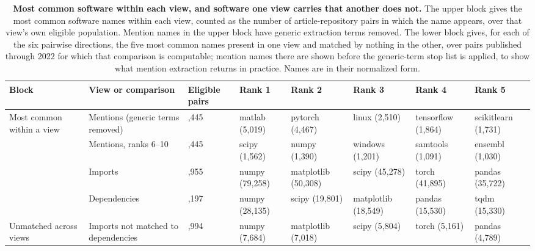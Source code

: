 \documentclass[pdflatex,sn-nature]{sn-jnl}%
\begin{document}


\begin{table}
\caption{\textbf{Most common software within each view, and software one view carries that another does not.} The upper block gives the most common software names within each view, counted as the number of article-repository pairs in which the name appears, over that view's own eligible population. Mention names in the upper block have generic extraction terms removed. The lower block gives, for each of the six pairwise directions, the five most common names present in one view and matched by nothing in the other, over pairs published through 2022 for which that comparison is computable; mention names there are shown before the generic-term stop list is applied, to show what mention extraction returns in practice. Names are in their normalized form.}\label{stab:topsoftware}
\footnotesize
\setlength{\tabcolsep}{2.5pt}
\begin{tabular}{@{}>{\raggedright\arraybackslash}p{44pt}>{\raggedright\arraybackslash}p{86pt}>{\raggedleft\arraybackslash}p{32pt}>{\raggedright\arraybackslash}p{60pt}>{\raggedright\arraybackslash}p{70pt}>{\raggedright\arraybackslash}p{78pt}>{\raggedright\arraybackslash}p{72pt}>{\raggedright\arraybackslash}p{68pt}@{}}
\toprule
Block & View or comparison & Eligible pairs & Rank 1 & Rank 2 & Rank 3 & Rank 4 & Rank 5 \\
\midrule
Most common within a view & Mentions (generic terms removed) & 52,445 & matlab (5,019) & pytorch (4,467) & linux (2,510) & tensorflow (1,864) & scikitlearn (1,731) \\
 & Mentions, ranks 6--10 & 52,445 & scipy (1,562) & numpy (1,390) & windows (1,201) & samtools (1,091) & ensembl (1,030) \\
 & Imports & 96,955 & numpy (79,258) & matplotlib (50,308) & scipy (45,278) & torch (41,895) & pandas (35,722) \\
 & Dependencies & 42,197 & numpy (28,135) & scipy (19,801) & matplotlib (18,549) & pandas (15,530) & tqdm (15,330) \\
\midrule
Unmatched across views & Imports not matched to dependencies & 41,994 & numpy (7,684) & matplotlib (7,018) & scipy (5,804) & torch (5,161) & pandas (4,789) \\

\end{tabular}
\end{table}
\end{document}
